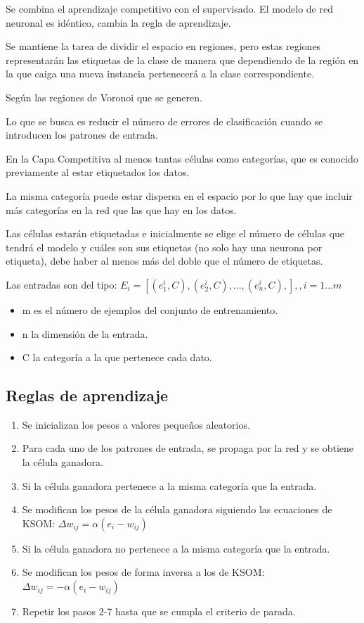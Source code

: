 \documentclass[12pt, twoside, openright]{report} %
\begin{document}
Se combina el aprendizaje competitivo con el supervisado. El modelo de red neuronal es idéntico, cambia la regla de aprendizaje.

Se mantiene la tarea de dividir el espacio en regiones, pero estas regiones representarán las etiquetas de la clase de manera que dependiendo de la región en la que caiga una nueva instancia pertenecerá a la clase correspondiente.

Según las regiones de Voronoi que se generen.

Lo que se busca es reducir el número de errores de clasificación cuando se introducen los patrones de entrada.

En la Capa Competitiva al menos tantas células como categorías, que es conocido previamente al estar etiquetados los datos.

La misma categoría puede estar dispersa en el espacio por lo que hay que incluir más categorías en la red que las que hay en los datos.

Las células estarán etiquetadas e inicialmente se elige el número de células que tendrá el modelo y cuáles son sus etiquetas (no solo hay una neurona por etiqueta), debe haber al menos más del doble que el número de etiquetas.

Las entradas son del tipo: $E_i = [(e_1^i, C),(e_2^i, C), ..., (e_n^i, C),],, i = 1...m$ 
\begin{itemize}
	\item m es el número de ejemplos del conjunto de entrenamiento.
	\item n la dimensión de la entrada.
	\item C la categoría a la que pertenece cada dato.
\end{itemize}

\subsection{Reglas de aprendizaje}
\begin{enumerate}
	\item Se inicializan los pesos a valores pequeños aleatorios.
	\item Para cada uno de los patrones de entrada, se propaga por la red y se obtiene la célula ganadora.
	\item Si la célula ganadora pertenece a la misma categoría que la entrada.
	\item Se modifican los pesos de la célula ganadora siguiendo las ecuaciones de KSOM: $\Delta w_{ij} = \alpha (e_i - w_{ij})$
	\item Si la célula ganadora no pertenece a la misma categoría que la entrada.
	\item Se modifican los pesos de forma inversa a los de KSOM: $\Delta w_{ij} = - \alpha (e_i - w_{ij})$
	\item Repetir los pasos 2-7 hasta que se cumpla el criterio de parada.
\end{enumerate}
\end{document}
